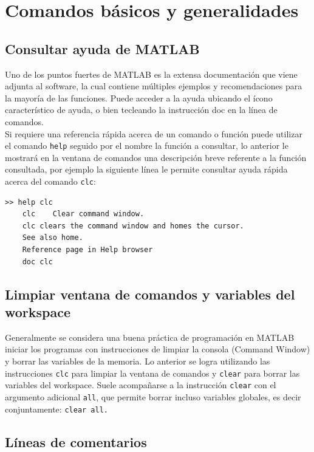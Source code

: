 \section{Comandos básicos y generalidades}

\subsection{Consultar ayuda de MATLAB}

Uno de los puntos fuertes de MATLAB es la extensa documentación que viene adjunta al software, la cual 
contiene múltiples ejemplos y recomendaciones para la mayoría de las funciones. Puede acceder a la ayuda 
ubicando el ícono característico de ayuda, o bien tecleando la instrucción doc en la línea de comandos.\\

Si requiere una referencia rápida acerca de un comando o función puede utilizar el comando \texttt{help} 
seguido por el nombre la función a consultar, lo anterior le mostrará en la ventana de comandos una descripción 
breve referente a la función consultada, por ejemplo la siguiente línea le permite consultar ayuda 
rápida acerca del  comando \texttt{clc}:

\begin{verbatim}
>> help clc
	clc    Clear command window.
	clc clears the command window and homes the cursor.
	See also home.
	Reference page in Help browser
	doc clc
\end{verbatim}

\subsection{Limpiar ventana de comandos y variables del workspace}

Generalmente se considera una buena práctica de programación en MATLAB iniciar los programas con 
instrucciones de limpiar la consola (Command Window) y borrar las variables de la memoria. Lo anterior 
se logra utilizando las instrucciones \texttt{clc} para limpiar la ventana de comandos y \texttt{clear} 
para borrar las variables del workspace. Suele acompañarse a la instrucción \texttt{clear} con el argumento 
adicional \texttt{all}, que permite borrar incluso variables globales, es decir 
conjuntamente: \texttt{clear all.}

\subsection{Líneas de comentarios}

